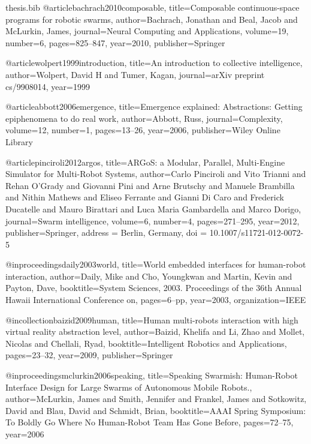 \documentclass[oneside, a4paper, 12pt]{memoir}
\begin{document}
\begin{filecontents}{thesis.bib}
@article{bachrach2010composable,
  title={Composable continuous-space programs for robotic swarms},
  author={Bachrach, Jonathan and Beal, Jacob and McLurkin, James},
  journal={Neural Computing and Applications},
  volume={19},
  number={6},
  pages={825--847},
  year={2010},
  publisher={Springer}
}

@article{wolpert1999introduction,
  title={An introduction to collective intelligence},
  author={Wolpert, David H and Tumer, Kagan},
  journal={arXiv preprint cs/9908014},
  year={1999}
}

@article{abbott2006emergence,
  title={Emergence explained: Abstractions: Getting epiphenomena to do real work},
  author={Abbott, Russ},
  journal={Complexity},
  volume={12},
  number={1},
  pages={13--26},
  year={2006},
  publisher={Wiley Online Library}
}

@article{pinciroli2012argos,
  title={{ARGoS}: a Modular, Parallel, Multi-Engine Simulator for Multi-Robot Systems},
  author={Carlo Pinciroli and Vito Trianni and Rehan O'Grady and Giovanni Pini and Arne Brutschy and Manuele Brambilla and Nithin Mathews and Eliseo Ferrante and Gianni {Di Caro} and Frederick Ducatelle and Mauro Birattari and Luca Maria Gambardella and Marco Dorigo},
  journal={Swarm intelligence},
  volume={6},
  number={4},
  pages={271--295},
  year={2012},
  publisher={Springer},
  address = {Berlin, Germany},
  doi = {10.1007/s11721-012-0072-5}
}

@inproceedings{daily2003world,
  title={World embedded interfaces for human-robot interaction},
  author={Daily, Mike and Cho, Youngkwan and Martin, Kevin and Payton, Dave},
  booktitle={System Sciences, 2003. Proceedings of the 36th Annual Hawaii International Conference on},
  pages={6--pp},
  year={2003},
  organization={IEEE}
}

@incollection{baizid2009human,
  title={Human multi-robots interaction with high virtual reality abstraction level},
  author={Baizid, Khelifa and Li, Zhao and Mollet, Nicolas and Chellali, Ryad},
  booktitle={Intelligent Robotics and Applications},
  pages={23--32},
  year={2009},
  publisher={Springer}
}

@inproceedings{mclurkin2006speaking,
  title={Speaking Swarmish: Human-Robot Interface Design for Large Swarms of Autonomous Mobile Robots.},
  author={McLurkin, James and Smith, Jennifer and Frankel, James and Sotkowitz, David and Blau, David and Schmidt, Brian},
  booktitle={AAAI Spring Symposium: To Boldly Go Where No Human-Robot Team Has Gone Before},
  pages={72--75},
  year={2006}
}


\end{filecontents}
\end{document}
